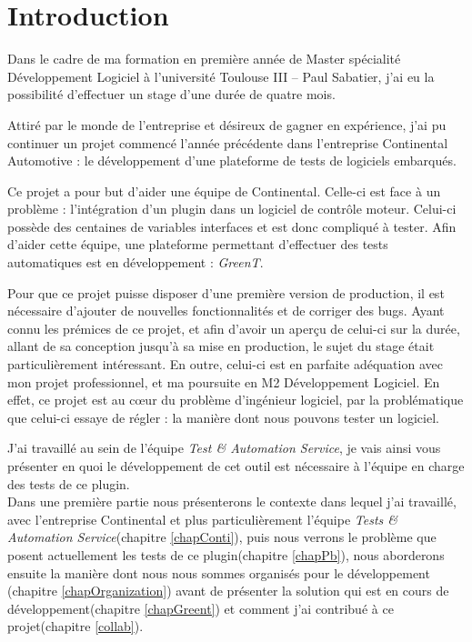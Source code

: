 \chapter*{Introduction}
Dans le cadre de ma formation en première année de Master spécialité Développement Logiciel à l'université Toulouse III – Paul Sabatier, j'ai eu la possibilité d'effectuer un stage d'une durée de quatre mois.

Attiré par le monde de l'entreprise et désireux de gagner en expérience, j'ai pu continuer un projet commencé l'année précédente dans l'entreprise Continental Automotive : le développement d'une plateforme de tests de logiciels embarqués.

Ce projet a pour but d'aider une équipe de Continental. Celle-ci est face à un problème : l'intégration d'un plugin dans un logiciel de contrôle moteur. Celui-ci possède des centaines de variables interfaces et est donc compliqué à tester. Afin d'aider cette équipe, une plateforme permettant d'effectuer des tests automatiques est en développement : \textit{GreenT}.

Pour que ce projet puisse disposer d'une première version de production, il est nécessaire d'ajouter de nouvelles fonctionnalités et de corriger des bugs. Ayant connu les prémices de ce projet, et afin d'avoir un aperçu de celui-ci sur la durée, allant de sa conception jusqu'à sa mise en production, le sujet du stage était particulièrement intéressant. En outre, celui-ci est en parfaite adéquation avec mon projet professionnel, et ma poursuite en M2 Développement Logiciel. En effet, ce projet est au cœur du problème d'ingénieur logiciel, par la problématique que celui-ci essaye de régler :  la manière dont nous pouvons tester un logiciel. 


J'ai travaillé au sein de l'équipe \textit{Test \& Automation Service}, je vais ainsi vous présenter en quoi le développement de cet outil est nécessaire à l'équipe en charge des tests de ce plugin.\\ Dans une première partie nous présenterons le contexte dans lequel j'ai travaillé, avec l'entreprise Continental et plus particulièrement l'équipe \textit{Tests \& Automation Service}(chapitre \ref{chapConti}), puis nous verrons le problème que posent actuellement les tests de ce plugin(chapitre \ref{chapPb}), nous aborderons ensuite la manière dont nous nous sommes organisés pour le développement (chapitre \ref{chapOrganization}) avant de présenter la solution qui est en cours de développement(chapitre \ref{chapGreent}) et comment j'ai contribué à ce projet(chapitre \ref{collab}). 

